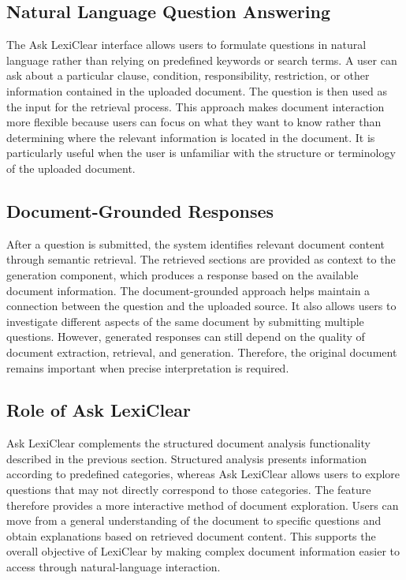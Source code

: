 \documentclass[12pt,a4paper,oneside]{report}
\begin{document}
\subsection{Natural Language Question Answering}

The Ask LexiClear interface allows users to formulate questions in natural
language rather than relying on predefined keywords or search terms. A user
can ask about a particular clause, condition, responsibility, restriction, or
other information contained in the uploaded document. The question is then
used as the input for the retrieval process. This approach makes document interaction more flexible because users can
focus on what they want to know rather than determining where the relevant
information is located in the document. It is particularly useful when the
user is unfamiliar with the structure or terminology of the uploaded
document.

\subsection{Document-Grounded Responses}

After a question is submitted, the system identifies relevant document
content through semantic retrieval. The retrieved sections are provided as
context to the generation component, which produces a response based on the
available document information. The document-grounded approach helps maintain a connection between the
question and the uploaded source. It also allows users to investigate
different aspects of the same document by submitting multiple questions.
However, generated responses can still depend on the quality of document
extraction, retrieval, and generation. Therefore, the original document
remains important when precise interpretation is required.

\subsection{Role of Ask LexiClear}

Ask LexiClear complements the structured document analysis functionality
described in the previous section. Structured analysis presents information
according to predefined categories, whereas Ask LexiClear allows users to
explore questions that may not directly correspond to those categories. The feature therefore provides a more interactive method of document
exploration. Users can move from a general understanding of the document to
specific questions and obtain explanations based on retrieved document
content. This supports the overall objective of LexiClear by making complex
document information easier to access through natural-language interaction.
\end{document}
